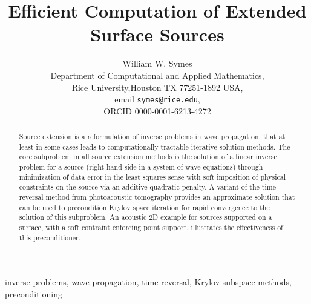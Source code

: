 \documentclass[georeport,12pt]{geophysics}
\begin{document}
\title{Efficient Computation of Extended Surface Sources}
\author{William W. Symes\\
  Department of Computational and Applied Mathematics,\\
  Rice University,Houston TX 77251-1892 USA,\\
  email {\tt symes@rice.edu},\\
ORCID 0000-0001-6213-4272}



\maketitle
\begin{abstract}
Source extension is a reformulation of inverse problems in wave propagation, that at least in some cases leads to computationally tractable iterative solution methods. The core subproblem in all source extension methods is the solution of a linear inverse problem for a source (right hand side in a system of wave equations) through minimization of data error in the least squares sense with soft imposition of physical constraints on the source via an additive quadratic penalty. A variant of the time reversal method from photoacoustic tomography provides an approximate solution that can be used to precondition Krylov space iteration for rapid convergence to the solution of this subproblem. An acoustic 2D example for sources supported on a surface, with a soft contraint enforcing point support, illustrates the effectiveness of this preconditioner.
\end{abstract}

 inverse problems, wave propagation, time
reversal, Krylov subspace methods, preconditioning

\end{document}
